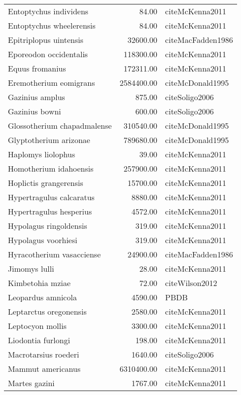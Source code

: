 \begin{table}[ht]
\begin{tabular}{lrl}
  Entoptychus individens & 84.00 & cite{McKenna2011} \\ 
  Entoptychus wheelerensis & 84.00 & cite{McKenna2011} \\ 
  Epitriplopus uintensis & 32600.00 & cite{MacFadden1986} \\ 
  Eporeodon occidentalis & 118300.00 & cite{McKenna2011} \\ 
  Equus fromanius & 172311.00 & cite{McKenna2011} \\ 
  Eremotherium eomigrans & 2584400.00 & cite{McDonald1995} \\ 
  Gazinius amplus & 875.00 & cite{Soligo2006} \\ 
  Gazinius bowni & 600.00 & cite{Soligo2006} \\ 
  Glossotherium chapadmalense & 310540.00 & cite{McDonald1995} \\ 
  Glyptotherium arizonae & 789680.00 & cite{McDonald1995} \\ 
  Haplomys liolophus & 39.00 & cite{McKenna2011} \\ 
  Homotherium idahoensis & 257900.00 & cite{McKenna2011} \\ 
  Hoplictis grangerensis & 15700.00 & cite{McKenna2011} \\ 
  Hypertragulus calcaratus & 8880.00 & cite{McKenna2011} \\ 
  Hypertragulus hesperius & 4572.00 & cite{McKenna2011} \\ 
  Hypolagus ringoldensis & 319.00 & cite{McKenna2011} \\ 
  Hypolagus voorhiesi & 319.00 & cite{McKenna2011} \\ 
  Hyracotherium vasacciense & 24900.00 & cite{MacFadden1986} \\ 
  Jimomys lulli & 28.00 & cite{McKenna2011} \\ 
  Kimbetohia mziae & 72.00 & cite{Wilson2012} \\ 
  Leopardus amnicola & 4590.00 & PBDB \\ 
  Leptarctus oregonensis & 2580.00 & cite{McKenna2011} \\ 
  Leptocyon mollis & 3300.00 & cite{McKenna2011} \\ 
  Liodontia furlongi & 198.00 & cite{McKenna2011} \\ 
  Macrotarsius roederi & 1640.00 & cite{Soligo2006} \\ 
  Mammut americanus & 6310400.00 & cite{McKenna2011} \\ 
  Martes gazini & 1767.00 & cite{McKenna2011} \\ 

\end{tabular}
\end{table}
